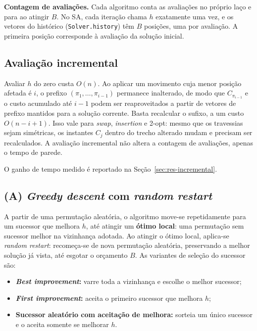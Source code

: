 \textbf{Contagem de avaliações.} Cada algoritmo conta as avaliações no próprio laço e para ao atingir $B$. No SA, cada iteração chama $h$ exatamente uma vez, e os vetores do histórico (\texttt{Solver.history}) têm $B$ posições, uma por avaliação. A primeira posição corresponde à avaliação da solução inicial.

\subsection{Avaliação incremental}\label{sec:incremental}

Avaliar $h$ do zero custa $O(n)$. Ao aplicar um movimento cuja menor posição afetada é $i$, o prefixo $(\pi_1,\dots,\pi_{i-1})$ permanece inalterado, de modo que $C_{\pi_{i-1}}$ e o custo acumulado até $i-1$ podem ser reaproveitados a partir de vetores de prefixo mantidos para a solução corrente. Basta recalcular o sufixo, a um custo $O(n-i+1)$. Isso vale para \textit{swap}, \textit{insertion} e 2-opt: mesmo que os travessias sejam simétricas, os instantes $C_j$ dentro do trecho alterado mudam e precisam ser recalculados. A avaliação incremental não altera a contagem de avaliações, apenas o tempo de parede.


O ganho de tempo medido é reportado na Seção~\ref{sec:res-incremental}.

\subsection{(A) \textit{Greedy descent} com \textit{random restart}}\label{sec:greedy}

A partir de uma permutação aleatória, o algoritmo move-se repetidamente para um sucessor que melhora $h$, até atingir um \textbf{ótimo local}: uma permutação sem sucessor melhor na vizinhança adotada. Ao atingir o ótimo local, aplica-se \textit{random restart}: recomeça-se de nova permutação aleatória, preservando a melhor solução já vista, até esgotar o orçamento $B$. As variantes de seleção do sucessor são:

\begin{itemize}
  \item \textbf{\textit{Best improvement}:} varre toda a vizinhança e escolhe o melhor sucessor;
  \item \textbf{\textit{First improvement}:} aceita o primeiro sucessor que melhora $h$;
  \item \textbf{Sucessor aleatório com aceitação de melhora:} sorteia um único sucessor e o aceita somente se melhorar $h$.
\end{itemize}

